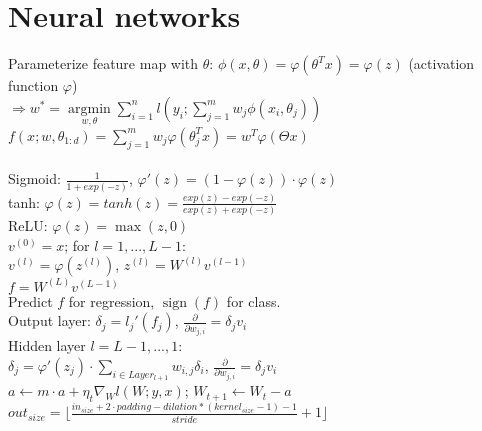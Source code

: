 \section*{Neural networks}
Parameterize feature map with $\theta$: $\phi(x,\theta) = \varphi(\theta^T x) = \varphi(z)$ (activation function $\varphi$)\\
$\Rightarrow w^* = \underset{w, \theta}{\operatorname{argmin}} \sum_{i=1}^n l(y_i; \sum_{j=1}^m w_j \phi(x_i, \theta_j))$\\
$f(x; w, \theta_{1:d}) = \sum_{j=1}^m w_j \varphi(\theta_j^T x) = w^T \varphi(\Theta x)$\\
\\
Sigmoid: $\frac{1}{1+exp(-z)}$,  $\varphi'(z) = (1 - \varphi(z))\cdot\varphi(z)$\\
tanh: $\varphi(z) = tanh(z) = \frac{exp(z)-exp(-z)}{exp(z)+exp(-z)}$\\
ReLU:  $\varphi(z) = \max(z,0)$\\
$v^{(0)} = x$; for $l = 1,...,L-1$: \\
$v^{(l)} = \varphi(z^{(l)})$, $z^{(l)} = W^{(l)}v^{(l-1)}$\\
$f = W^{(L)}v^{(L-1)}$\\
Predict $f$ for regression, $\operatorname{sign}(f)$ for class.\\
Output layer: 
$\delta_j = l_j'(f_j)$,
$\frac{\partial}{\partial w_{j,i}} = \delta_j v_i$\\
Hidden layer $l=L-1,...,1$:\\
$\delta_j = \varphi'(z_j) \cdot \sum_{i\in Layer_{l+1}} w_{i,j}\delta_i$,
$\frac{\partial}{\partial w_{j,i}} = \delta_j v_i$\\
$a \leftarrow m \cdot a + \eta_t \nabla_W l(W;y,x)$; $W_{t+1} \leftarrow W_t - a$\\
 $out_{size} = \lfloor \frac{in_{size} + 2\cdot padding - dilation*(kernel_{size} -1) - 1}{stride}  +1  \rfloor $